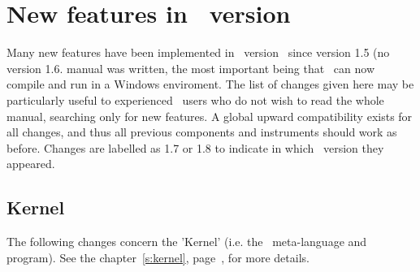 
\chapter{New features in \MCS\ version \version\ }
\label{c:changes}

Many new features have been implemented in \MCS\ version \version\  since
version 1.5 (no version 1.6. manual was written, the most important being that
\MCS\ can now compile and run in a Windows enviroment.  The list of changes
given here may be particularly  useful to experienced \MCS\ users who do not
wish to read the whole  manual, searching only for new features. A global
upward compatibility  exists for all changes, and thus all previous components
and  instruments should work as before. Changes are labelled as 1.7 or 1.8 to 
indicate in which \MCS\ version they appeared. 

\section{Kernel} 
\label{s:new-features:kernel}

The following changes concern the 'Kernel' (i.e. the \MCS\ meta-language and program). See the chapter~\ref{s:kernel}, page~\pageref{s:kernel}, for more details.

